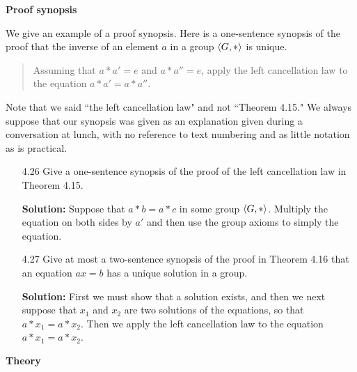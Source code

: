 \noindent \textbf{Proof synopsis}

\noindent We give an example of a proof synopsis. Here is a one-sentence
          synopsis of the proof that the inverse of an element $a$ in a group
          $\langle G, * \rangle$ is unique.
\begin{quote}
Assuming that $a * a' = e$ and $a * a'' = e$, apply the left cancellation law to
the equation $a * a' = a * a''$.
\end{quote}

\noindent Note that we said ``the left cancellation law" and not
          ``Theorem 4.15." We always suppose that our synopsis was given as an
          explanation given during a conversation at lunch, with no reference to
          text numbering and as little notation as is practical.
\begin{enumerate}
   \item[4.26] Give a one-sentence synopsis of the proof of the left 
               cancellation law in Theorem 4.15.

      \textbf{Solution:} Suppose that $a * b = a * c$ in some group
      $\langle G, * \rangle$. Multiply the equation on both sides by $a'$ and then use
      the group axioms to simply the equation.
   \item[4.27] Give at most a two-sentence synopsis of the proof in Theorem
               4.16 that an equation $ax = b$ has a unique solution in a group.

      \textbf{Solution:} First we must show that a solution exists, and then we 
      next suppose that $x_1$ and $x_2$ are two solutions of the equations, so 
      that $a * x_1 = a * x_2$. Then we apply the left cancellation law to the 
      equation $a * x_1 = a * x_2$.
      


\end{enumerate}

\noindent \textbf{Theory}

